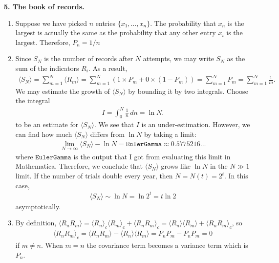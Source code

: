 \documentclass{article}
\theoremstyle{definition}
\newcommand{\f}[2]{\frac{#1}{#2}}
\begin{document}
\noindent \textbf{5. The book of records.} 

\begin{enumerate}[label=(\alph*)]
	\item Suppose we have picked $n$ entries $\{x_1,\dots,x_n\}$. The probability that $x_n$ is the largest is actually the same as the probability that any other entry $x_i$ is the largest. Therefore, $\boxed{P_n = 1/n}$
	
	\item Since $S_N$ is the number of records after $N$ attempts, we may write $S_N$ as the sum of the indicators $R_i$. As a result,
	\begin{align*}
	\langle S_N \rangle = \sum^N_{m=1} \langle R_m \rangle = \sum^N_{m=1} (1\times P_m + 0\times (1-P_m)) = \sum^N_{m=1} P_m = \sum^N_{m=1}\f{1}{m}.
	\end{align*}
	We may estimate the growth of $\langle S_N \rangle$ by bounding it by two integrals. Choose the integral 
	\begin{align*}
	I = \int_0^N \f{1}{n}\,dn = \ln N.
	\end{align*}
	to be an estimate for $\langle S_N \rangle$. We see that $I$ is an under-estimation. However, we can find how much $\langle S_N \rangle$ differs from $\ln N$ by taking a limit:
	\begin{align*}
	\lim_{N\to \infty} \langle S_N \rangle - \ln N = \texttt{EulerGamma} \approx 0.5775216\dots
	\end{align*}
	where $\texttt{EulerGamma}$ is the output that I got from evaluating this limit in Mathematica. Therefore, we conclude that $\langle S_N \rangle$ grows like $\boxed{\ln N}$ in the $N\gg 1$ limit. If the number of trials double every year, then $N = N(t) = 2^t$. In this case,
	\begin{align*}
	\langle S_N \rangle \sim \ln N = \ln 2^t = \boxed{t\ln 2}
	\end{align*}
	asymptotically. 
	
	
	
	\item  By definition, $\langle R_n R_m \rangle = \langle R_n \rangle_c \langle R_m \rangle_c + \langle R_n R_m \rangle_c = \langle R_n \rangle \langle R_m \rangle + \langle R_n R_m \rangle_c$, so
	\begin{align*}
	\langle R_n R_m \rangle_c = \langle R_n R_m \rangle - \langle R_n \rangle \langle R_m \rangle = P_nP_m - P_nP_m = 0
	\end{align*}
	if $m\neq n$. When $m=n$ the covariance term becomes a variance term which is $P_n$. 
	

\end{enumerate}
\end{document}
